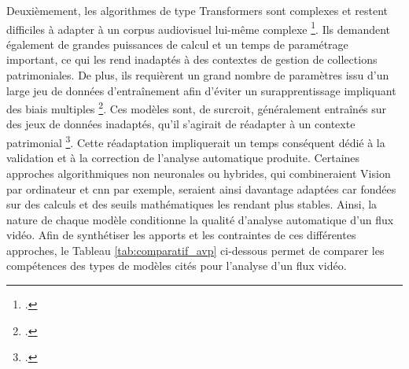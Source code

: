 Deuxièmement, les algorithmes de type \gls{Transformers} sont complexes et restent difficiles à adapter à un corpus audiovisuel lui-même complexe \footcite{yuan2025}. Ils demandent également de grandes puissances de calcul et un temps de paramétrage important, ce qui les rend inadaptés à des contextes de gestion de collections patrimoniales. De plus, ils requièrent un grand nombre de paramètres issu d’un large jeu de données d’entraînement afin d’éviter un surapprentissage impliquant des biais multiples \footcite{pattichis2023}. Ces modèles sont, de surcroit, généralement entraînés sur des jeux de données inadaptés, qu'il s'agirait de réadapter à un contexte patrimonial \footcite{pattichis2023}. Cette réadaptation impliquerait un temps conséquent dédié à la validation et à la correction de l'analyse automatique produite. Certaines approches algorithmiques non neuronales ou hybrides, qui combineraient \gls{Vision par ordinateur} et \gls{cnn} par exemple, seraient ainsi davantage adaptées car fondées sur des calculs et des seuils mathématiques les rendant plus stables. 
Ainsi, la nature de chaque modèle conditionne la qualité d'analyse automatique d'un flux vidéo. Afin de synthétiser les apports et les contraintes de ces différentes approches, le Tableau \ref{tab:comparatif_avp} ci-dessous permet de comparer les compétences des types de modèles cités pour l'analyse d'un flux vidéo. 


